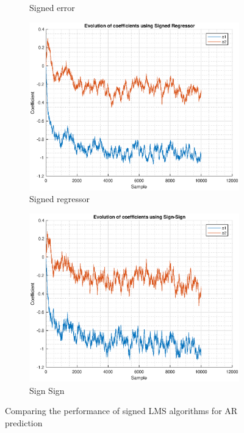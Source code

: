 \documentclass{article}
\begin{document}
\begin{figure}[h!]
\begin{subfigure}{0.33\textwidth}
\caption{Signed error}
\label{fig:salg_signerr_ar}
\end{subfigure}
\begin{subfigure}{0.33\textwidth}
\centering
\includegraphics[width = \textwidth]{salg_regressor_ar}
\caption{Signed regressor}
\label{fig:salg_regressor_ar}
\end{subfigure}
\begin{subfigure}{0.33\textwidth}
\centering
\includegraphics[width = \textwidth]{salg_signsign_ar}
\caption{Sign Sign}
\label{fig:salg_signsign_ar}
\end{subfigure}
\caption{Comparing the performance of signed LMS algorithms for AR prediction}
\label{fig:salg_ar}
\end{figure}
\end{document}
